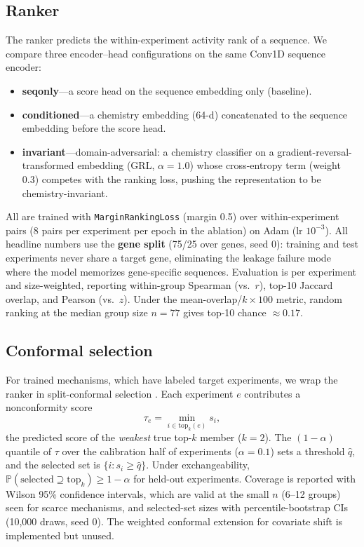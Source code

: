 \documentclass{article} %
\begin{document}
\subsection{Ranker}

The ranker predicts the within-experiment activity rank of a sequence. We compare three encoder--head configurations on the same Conv1D sequence encoder:
\begin{itemize}
\item \textbf{seqonly}---a score head on the sequence embedding only (baseline).
\item \textbf{conditioned}---a chemistry embedding (64-d) concatenated to the sequence embedding before the score head.
\item \textbf{invariant}---domain-adversarial: a chemistry classifier on a gradient-reversal-transformed embedding (GRL, $\alpha{=}1.0$) whose cross-entropy term (weight 0.3) competes with the ranking loss, pushing the representation to be chemistry-invariant.
\end{itemize}
All are trained with \texttt{MarginRankingLoss} (margin 0.5) over within-experiment pairs (8 pairs per experiment per epoch in the ablation) on Adam (lr $10^{-3}$). All headline numbers use the \textbf{gene split} (75/25 over genes, seed 0): training and test experiments never share a target gene, eliminating the leakage failure mode where the model memorizes gene-specific sequences. Evaluation is per experiment and size-weighted, reporting within-group Spearman (vs.\ $r$), top-10 Jaccard overlap, and Pearson (vs.\ $z$). Under the mean-overlap/$k\times100$ metric, random ranking at the median group size $n=77$ gives top-10 chance $\approx 0.17$.

\subsection{Conformal selection}

For trained mechanisms, which have labeled target experiments, we wrap the ranker in split-conformal selection \citep{vovk2005,tibshirani2019}. Each experiment $e$ contributes a nonconformity score
\begin{equation}
\tau_e = \min_{i \in \mathrm{top}_k(e)} s_i,
\end{equation}
the predicted score of the \emph{weakest} true top-$k$ member ($k{=}2$). The $(1-\alpha)$ quantile of $\tau$ over the calibration half of experiments ($\alpha {=} 0.1$) sets a threshold $\hat{q}$, and the selected set is $\{i : s_i \ge \hat{q}\}$. Under exchangeability, $\mathbb{P}(\text{selected} \supseteq \mathrm{top}_k) \ge 1-\alpha$ for held-out experiments. Coverage is reported with Wilson 95\% confidence intervals, which are valid at the small $n$ (6--12 groups) seen for scarce mechanisms, and selected-set sizes with percentile-bootstrap CIs (10{,}000 draws, seed 0). The weighted conformal extension for covariate shift \citep{tibshirani2019} is implemented but unused.
\end{document}
